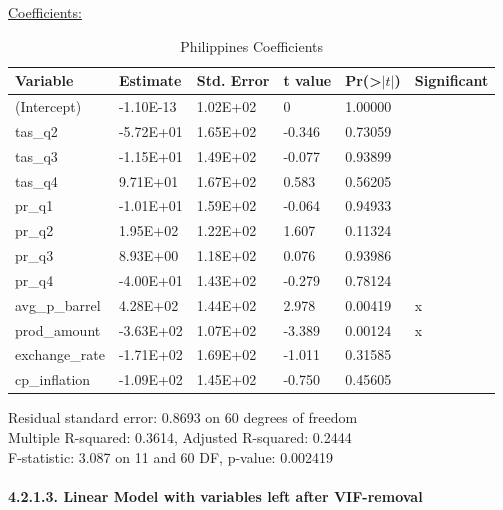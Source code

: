\documentclass[11pt]{article}
\begin{document}
\underline{Coefficients:}
\FloatBarrier
\begin{table}[!htbp]
\centering
\begin{tabular}{llllll}
\hline
Variable       & Estimate  & Std. Error & t value & Pr(\textgreater$|t|$) & Significant \\ \hline
(Intercept)    & -1.10E-13 & 1.02E+02   & 0       & 1.00000             &             \\
tas\_q2        & -5.72E+01 & 1.65E+02   & -0.346  & 0.73059             &             \\
tas\_q3        & -1.15E+01 & 1.49E+02   & -0.077  & 0.93899             &             \\
tas\_q4        & 9.71E+01  & 1.67E+02   & 0.583   & 0.56205             &             \\
pr\_q1         & -1.01E+01 & 1.59E+02   & -0.064  & 0.94933             &             \\
pr\_q2         & 1.95E+02  & 1.22E+02   & 1.607   & 0.11324             &             \\
pr\_q3         & 8.93E+00  & 1.18E+02   & 0.076   & 0.93986             &             \\
pr\_q4         & -4.00E+01 & 1.43E+02   & -0.279  & 0.78124             &             \\
avg\_p\_barrel & 4.28E+02  & 1.44E+02   & 2.978   & 0.00419             & x           \\
prod\_amount   & -3.63E+02 & 1.07E+02   & -3.389  & 0.00124             & x           \\
exchange\_rate & -1.71E+02 & 1.69E+02   & -1.011  & 0.31585             &             \\
cp\_inflation  & -1.09E+02 & 1.45E+02   & -0.750  & 0.45605             &            \\ \hline
\end{tabular}
\caption{Philippines Coefficients}
\label{table12}
\end{table}
\FloatBarrier
Residual standard error: 0.8693 on 60 degrees of freedom \\
Multiple R-squared:  0.3614,	Adjusted R-squared:  0.2444 \\ 
F-statistic: 3.087 on 11 and 60 DF,  p-value: 0.002419 \\

\newpage
\paragraph{4.2.1.3. Linear Model with variables left after VIF-removal}
\end{document}
